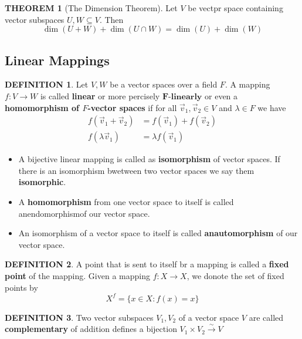 \documentclass[12pt]{article}
\theoremstyle{definition}
\newtheorem{definition}{DEFINITION}[subsection]
\newtheorem{theorem}{THEOREM}[subsection]
\begin{document}
\begin{theorem}[The Dimension Theorem]
    Let $V$ be vectpr space containing vector subspaces $U,W \subseteq V$. Then
    $$\dim(U + W) + \dim(U\cap W) = \dim(U) + \dim(W)$$
\end{theorem}

\subsection{Linear Mappings}
\begin{definition}
    Let $V,W$ be a vector spaces over a field $F$. A mapping $f: V \rightarrow W$ is called \textbf{linear} or more percisely $\mathbf{F}\textbf{-linearly}$ or even a \textbf{homomorphism of $F$-vector spaces} if for all $\overrightarrow{v}_1, \overrightarrow{v}_2 \in V$ and $\lambda \in F$ we have \[\begin{split}
        f(\overrightarrow{v}_1 + \overrightarrow{v}_2) &= f(\overrightarrow{v}_1) + f(\overrightarrow{v}_2)\\
        f(\lambda\overrightarrow{v}_1) &= \lambda f(\overrightarrow{v}_1) 
    \end{split}\]
\end{definition}

\begin{itemize}
    \item A bijective linear mapping is called as \textbf{isomorphism} of vector spaces. If there is an isomorphism bwetween two vector spaces we say them \textbf{isomorphic}.
    \item A \textbf{homomorphism} from one vector space to itself is called anendomorphismof our vector space.
    \item An isomorphism of a vector space to itself is called \textbf{anautomorphism} of our vector space.
\end{itemize}

\begin{definition}
    A point that is sent to itself br a mapping is called a \textbf{fixed point} of the mapping.
    Given a mapping $f: X \rightarrow X$, we donote the set of fixed points by $$X^f = \{x \in X: f(x) = x\}$$
\end{definition}

\begin{definition}
    Two vector subspaces $V_1,V_2$ of a vector space $V$ are called \textbf{complementary} of addition defines a bijection $V_1 \times V_2 {\stackrel{\sim}{\rightarrow}} V$
\end{definition}
\end{document}
